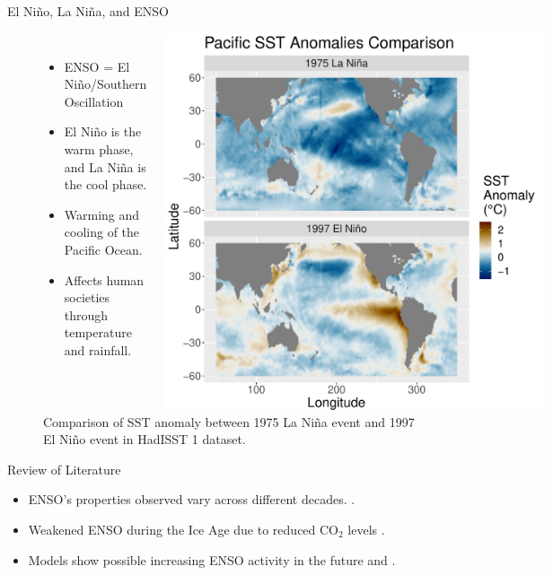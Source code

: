 \documentclass[aspectratio=1610]{beamer}
\begin{document}
\begin{frame}{El Niño, La Niña, and ENSO}
  \begin{figure}
    \begin{columns}
      \begin{itemize}
      \item ENSO = El Niño/Southern Oscillation
      \item El Niño is the warm phase, and La Niña is the cool phase.
      \item Warming and cooling of the Pacific Ocean.
      \item Affects human societies through temperature and rainfall. \citep{ropelewski1987global}
      \end{itemize}
      \caption{Comparison of SST anomaly between 1975 La Niña event and 1997 El Niño event in HadISST 1 dataset. \citep{rayner2003global}}
      \includegraphics[width = \textwidth]{figures/intro_fig.pdf}
    \end{columns}
  \end{figure}
\end{frame}

\begin{frame}{Review of Literature}
  \begin{itemize}
  \item ENSO's properties observed vary across different decades. \citep{lubbecke2014assessing}.
  \item Weakened ENSO during the Ice Age due to reduced CO$_2$ levels \citep{zhu2017reduced}.
  \item Models show possible increasing ENSO activity in the future \citep{zheng2017response} and \citep{maher2018enso}.
  \end{itemize}
\end{frame}
\end{document}
